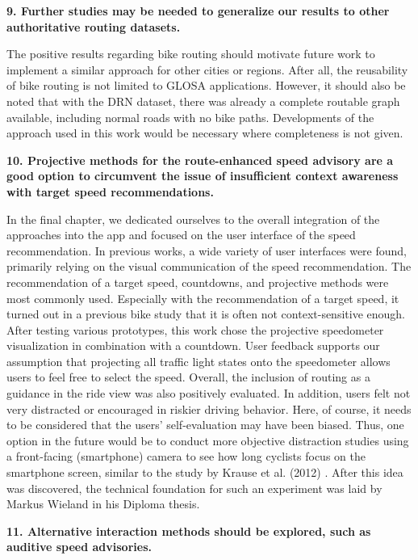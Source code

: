 \textbf{\color{cidarkblue}9. Further studies may be needed to generalize our results to other authoritative routing datasets.} 

The positive results regarding bike routing should motivate future work to implement a similar approach for other cities or regions. After all, the reusability of bike routing is not limited to GLOSA applications. However, it should also be noted that with the DRN dataset, there was already a complete routable graph available, including normal roads with no bike paths. Developments of the approach used in this work would be necessary where completeness is not given.

\textbf{\color{cidarkblue}10. Projective methods for the route-enhanced speed advisory are a good option to circumvent the issue of insufficient context awareness with target speed recommendations.} 

In the final chapter, we dedicated ourselves to the overall integration of the approaches into the app and focused on the user interface of the speed recommendation. In previous works, a wide variety of user interfaces were found, primarily relying on the visual communication of the speed recommendation. The recommendation of a target speed, countdowns, and projective methods were most commonly used. Especially with the recommendation of a target speed, it turned out in a previous bike study that it is often not context-sensitive enough. After testing various prototypes, this work chose the projective speedometer visualization in combination with a countdown. User feedback supports our assumption that projecting all traffic light states onto the speedometer allows users to feel free to select the speed. Overall, the inclusion of routing as a guidance in the ride view was also positively evaluated. In addition, users felt not very distracted or encouraged in riskier driving behavior. Here, of course, it needs to be considered that the users' self-evaluation may have been biased. Thus, one option in the future would be to conduct more objective distraction studies using a front-facing (smartphone) camera to see how long cyclists focus on the smartphone screen, similar to the study by Krause et al. (2012) \cite{krause_traffic_2012}. After this idea was discovered, the technical foundation for such an experiment was laid by Markus Wieland \cite{wieland_2023} in his Diploma thesis.

\textbf{\color{cidarkblue}11. Alternative interaction methods should be explored, such as auditive speed advisories.} 

